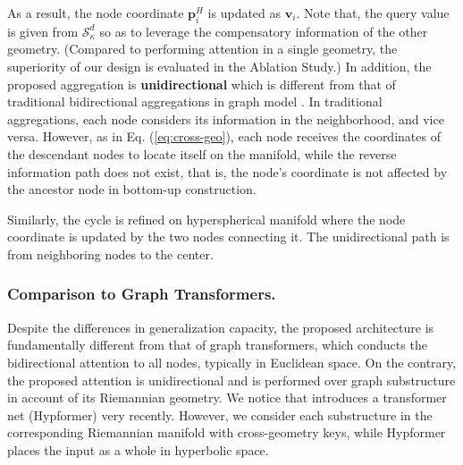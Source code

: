 As a result, the node coordinate $\boldsymbol p^H_i$ is updated as $\boldsymbol v_i$.
Note that, the query value is given from $\mathcal S^d_\kappa$ so as to leverage the compensatory information of the other geometry.
(Compared to performing attention in a single geometry, the superiority of our design is evaluated in the Ablation Study.)
In addition, the proposed aggregation is \textbf{unidirectional} which is different from that of traditional bidirectional aggregations in graph model \cite{iclr17gcn,nips17GraphSAGE,www21Lgcn}. 
In traditional aggregations, each node considers its information in the neighborhood, and vice versa.
However, as in Eq. (\ref{eq:cross-geo}), each node receives the coordinates of the descendant nodes to locate itself on the manifold, 
while the reverse information path does not exist, that is, the node's coordinate is not affected by the ancestor node in bottom-up construction.


Similarly, the cycle is refined on hyperspherical manifold where the node coordinate is updated by the two nodes connecting it.
The unidirectional path is from neighboring nodes to the center.

\subsubsection*{\textbf{Comparison to Graph Transformers.}}
Despite the differences in generalization capacity, 
the proposed architecture is fundamentally different from that of graph transformers,
which conducts the bidirectional attention to all nodes, typically in Euclidean space.
On the contrary, the proposed attention is unidirectional and is performed over graph substructure in account of its Riemannian geometry.
We notice that \citet{kdd24Hypformer} introduces a transformer net (Hypformer) very recently.
However, we consider each substructure in the corresponding Riemannian manifold with cross-geometry keys, while Hypformer places the input as a whole in hyperbolic space.



